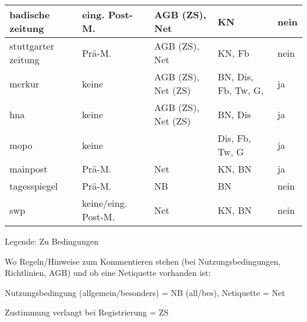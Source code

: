 \begin{landscape}
\begin{longtable}{l|llll}
badische zeitung	& eing. Post-M.		& AGB (ZS), Net			& KN 							& nein \tabularnewline \hline
stuttgarter zeitung	& Prä-M.		& AGB (ZS), Net			& KN, Fb 						& nein \tabularnewline \hline
merkur			& keine			& AGB (ZS), Net (ZS)		& BN, Dis, Fb, Tw, G, 				& ja \tabularnewline \hline
hna			& keine			& AGB (ZS), Net (ZS)		& BN, Dis 						& ja \tabularnewline \hline
mopo			& keine			&				& Dis, Fb, Tw, G 					& ja \tabularnewline \hline
mainpost		& Prä-M.		& Net				& KN, BN 						& ja \tabularnewline \hline
tagesspiegel		& Prä-M.		& NB				& BN 							& nein \tabularnewline \hline
swp			& keine/eing. Post-M.	& Net				& KN, BN 						& nein \tabularnewline \hline


\end{longtable}
\end{landscape}

Legende: Zu Bedingungen

Wo Regeln/Hinweise zum Kommentieren stehen (bei Nutzungsbedingungen, Richtlinien, AGB) und ob eine Netiquette vorhanden ist:

Nutzungsbedingung (allgemein/besonders) = NB (all/bes), Netiquette = Net

Zustimmung verlangt bei Registrierung = ZS
